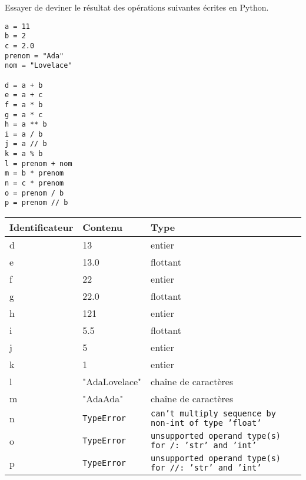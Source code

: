 \begin{cor}[Python]
Essayer de deviner le résultat des opérations suivantes écrites en Python.
\begin{multicols}{2}
\begin{lstlisting}
a = 11
b = 2
c = 2.0
prenom = "Ada"
nom = "Lovelace"

d = a + b
e = a + c
f = a * b
g = a * c
h = a ** b
i = a / b
j = a // b
k = a % b
l = prenom + nom
m = b * prenom
n = c * prenom
o = prenom / b
p = prenom // b
\end{lstlisting}

\columnbreak

\noindent
\begin{tabularx}{\linewidth}{|X|X|X|}
\hline
Identificateur & Contenu & Type \\
\hline
d & 13 & entier\\
\hline
e & 13.0 & flottant\\
\hline
f & 22 & entier\\
\hline
g & 22.0 & flottant\\
\hline
h & 121 & entier \\
\hline
i & 5.5 & flottant\\
\hline
j & 5 & entier\\
\hline
k & 1 & entier\\
\hline
l & "AdaLovelace" & chaîne de caractères\\
\hline
m & "AdaAda" & chaîne de caractères\\
\hline
n & \texttt{TypeError} & \texttt{can't multiply sequence by non-int of type 'float'}\\
\hline
o & \texttt{TypeError} & \texttt{unsupported operand type(s) for /: 'str' and 'int'}\\
\hline
p & \texttt{TypeError} &\texttt{unsupported operand type(s) for //: 'str' and 'int'} \\
\hline
\end{tabularx}
\end{multicols}
\end{cor}

